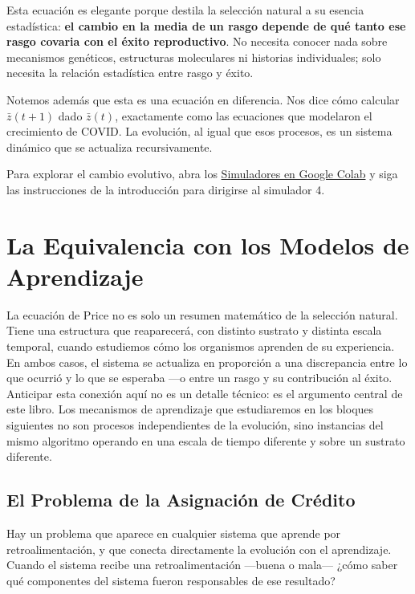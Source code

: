 \documentclass[
  letterpaper,
  DIV=11,
  numbers=noendperiod]{scrreprt}
\begin{document}
Esta ecuación es elegante porque destila la selección natural a su
esencia estadística: \textbf{el cambio en la media de un rasgo depende
de qué tanto ese rasgo covaria con el éxito reproductivo}. No necesita
conocer nada sobre mecanismos genéticos, estructuras moleculares ni
historias individuales; solo necesita la relación estadística entre
rasgo y éxito.

Notemos además que esta es una ecuación en diferencia. Nos dice cómo
calcular \(\bar{z}(t+1)\) dado \(\bar{z}(t)\), exactamente como las
ecuaciones que modelaron el crecimiento de COVID. La evolución, al igual
que esos procesos, es un sistema dinámico que se actualiza
recursivamente.

Para explorar el cambio evolutivo, abra los
\href{https://colab.research.google.com/drive/1jzI4TI74eFj9ORO63YleCOq99sq0aXO0}{Simuladores
en Google Colab} y siga las instrucciones de la introducción para
dirigirse al simulador 4.

\section{La Equivalencia con los Modelos de
Aprendizaje}\label{la-equivalencia-con-los-modelos-de-aprendizaje}

La ecuación de Price no es solo un resumen matemático de la selección
natural. Tiene una estructura que reaparecerá, con distinto sustrato y
distinta escala temporal, cuando estudiemos cómo los organismos aprenden
de su experiencia. En ambos casos, el sistema se actualiza en proporción
a una discrepancia entre lo que ocurrió y lo que se esperaba ---o entre
un rasgo y su contribución al éxito. Anticipar esta conexión aquí no es
un detalle técnico: es el argumento central de este libro. Los
mecanismos de aprendizaje que estudiaremos en los bloques siguientes no
son procesos independientes de la evolución, sino instancias del mismo
algoritmo operando en una escala de tiempo diferente y sobre un sustrato
diferente.

\subsection{El Problema de la Asignación de
Crédito}\label{el-problema-de-la-asignaciuxf3n-de-cruxe9dito}

Hay un problema que aparece en cualquier sistema que aprende por
retroalimentación, y que conecta directamente la evolución con el
aprendizaje. Cuando el sistema recibe una retroalimentación ---buena o
mala--- ¿cómo saber qué componentes del sistema fueron responsables de
ese resultado?
\end{document}
